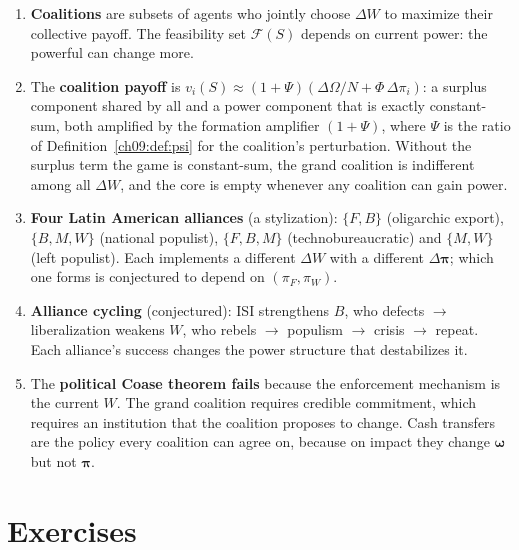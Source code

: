 \documentclass[../structural_economics_book.tex]{subfiles}
\begin{document}
\begin{enumerate}
\item \textbf{Coalitions} are subsets of agents who jointly choose $\Delta W$ to maximize their collective payoff. The feasibility set $\mathcal{F}(S)$ depends on current power: the powerful can change more.

\item The \textbf{coalition payoff} is $v_i(S) \approx (1+\Psi)(\Delta\Omega/N + \Phi\,\Delta\pi_i)$: a surplus component shared by all and a power component that is exactly constant-sum, both amplified by the formation amplifier $(1+\Psi)$, where $\Psi$ is the ratio of Definition~\ref{ch09:def:psi} for the coalition's perturbation. Without the surplus term the game is constant-sum, the grand coalition is indifferent among all $\Delta W$, and the core is empty whenever any coalition can gain power.

\item \textbf{Four Latin American alliances} (a stylization): $\{F,B\}$ (oligarchic export), $\{B,M,W\}$ (national populist), $\{F,B,M\}$ (techno\-bureaucratic) and $\{M,W\}$ (left populist). Each implements a different $\Delta W$ with a different $\Delta\boldsymbol{\pi}$; which one forms is conjectured to depend on $(\pi_F, \pi_W)$.

\item \textbf{Alliance cycling} (conjectured): ISI strengthens $B$, who defects $\to$ liberalization weakens $W$, who rebels $\to$ populism $\to$ crisis $\to$ repeat. Each alliance's success changes the power structure that destabilizes it.

\item The \textbf{political Coase theorem fails} because the enforcement mechanism is the current $W$. The grand coalition requires credible commitment, which requires an institution that the coalition proposes to change. Cash transfers are the policy every coalition can agree on, because on impact they change $\boldsymbol{\omega}$ but not $\boldsymbol{\pi}$.
\end{enumerate}


\section{Exercises}
\label{ch14:sec:exercises}
\end{document}
